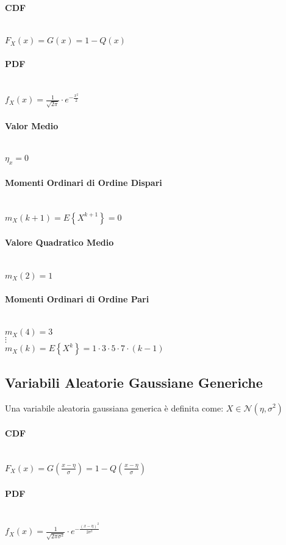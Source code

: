 \documentclass{article}
\begin{document}
\paragraph{CDF} ~\\
$F_X(x) = G \left(x\right) = 1 - Q \left(x\right)$
\paragraph{PDF} ~\\
$f_X(x) = \frac{1}{\sqrt{2 \pi}} \cdot e^{-\frac{x^2}{2}} $
\paragraph{Valor Medio} ~\\
$\eta_x = 0 $
\paragraph{Momenti Ordinari di Ordine Dispari} ~\\
$m_X(k+1) = E \left\{ X^{k+1}\right\} = 0$
\paragraph{Valore Quadratico Medio} ~\\
$m_X(2) = 1$
\paragraph{Momenti Ordinari di Ordine Pari} ~\\
$m_X(4) = 3$ \\
$\vdots$ \\
$m_X(k) = E \left\{ X^k \right\} = 1 \cdot 3 \cdot 5 \cdot 7 \cdot (k-1)$

\subsection{Variabili Aleatorie Gaussiane Generiche} 
Una variabile aleatoria gaussiana generica è definita come: $X \in \mathcal{N}(\eta, \sigma^2)$
\paragraph{CDF} ~\\
$F_X(x) = G \left(\frac{x-\eta}{\sigma}\right) = 1 - Q \left(\frac{x-\eta}{\sigma}\right)$
\paragraph{PDF} ~\\
$f_X(x) = \frac{1}{\sqrt{2 \pi \sigma^2}} \cdot e^{-\frac{\left( x - \eta \right)^2}{2\sigma^2}} $
\end{document}
